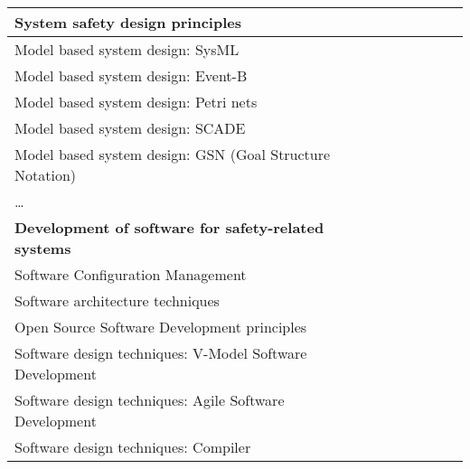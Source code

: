 \documentclass[a4paper, 11pt]{article}
\begin{document}
\begin{center}
\begin{longtable}{|r|r|r|r|r|r|r|r|}
    \hline
    \multicolumn{1}{|l|}{System safety design principles} & \multicolumn{1}{c|}{} &       &       &       &       &       &  \bigstrut\\
    \hline
    \multicolumn{1}{|l|}{Model based system design: SysML} & \multicolumn{1}{c|}{} &       &       &       &       &       &  \bigstrut\\
    \hline
    \multicolumn{1}{|l|}{Model based system design: Event-B} & \multicolumn{1}{c|}{} &       &       &       &       &       &  \bigstrut\\
    \hline
    \multicolumn{1}{|l|}{Model based system design: Petri nets} & \multicolumn{1}{c|}{} &       &       &       &       &       &  \bigstrut\\
    \hline
    \multicolumn{1}{|l|}{Model based system design: SCADE} & \multicolumn{1}{c|}{} &       &       &       &       &       &  \bigstrut\\
    \hline
    \multicolumn{1}{|l|}{Model based system design: GSN (Goal Structure Notation)} & \multicolumn{1}{c|}{} &       &       &       &       &       &  \bigstrut\\
    \hline
    \multicolumn{1}{|l|}{…} & \multicolumn{1}{c|}{} &       &       &       &       &       &  \bigstrut[t]\\
    \multicolumn{1}{|l|}{\textbf{Development of software for safety-related systems}} & \multicolumn{1}{l|}{\textbf{}} &       &       &       &       &       &  \\
    \multicolumn{1}{|l|}{Software Configuration Management} & \multicolumn{1}{l|}{} &       &       &       &       &       &  \bigstrut[b]\\
    \hline
    \multicolumn{1}{|l|}{Software architecture techniques} & \multicolumn{1}{l|}{} &       &       &       &       &       &  \bigstrut\\
    \hline
    \multicolumn{1}{|l|}{Open Source Software Development principles} & \multicolumn{1}{l|}{} &       &       &       &       &       &  \bigstrut\\
    \hline
    \multicolumn{1}{|l|}{Software design techniques: V-Model Software Development} & \multicolumn{1}{l|}{} &       &       &       &       &       &  \bigstrut\\
    \hline
    \multicolumn{1}{|l|}{Software design techniques: Agile Software Development} & \multicolumn{1}{l|}{} &       &       &       &       &       &  \bigstrut\\
    \hline
    \multicolumn{1}{|l|}{Software design techniques: Compiler} & \multicolumn{1}{l|}{} &       &       &       &       &       &  \bigstrut\\

\end{longtable}
\end{center}
\end{document}
